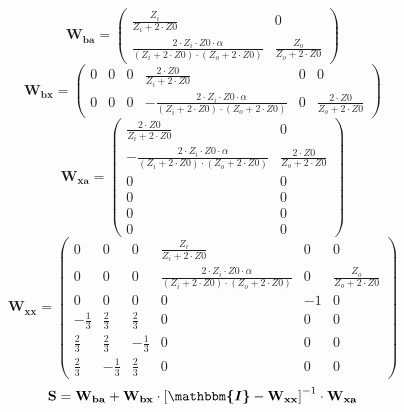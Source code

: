 \[ \mathbf{W_{ba}} = \left(\begin{smallmatrix} \frac{Z_i}{Z_i+2\cdot
Z0} & 0 \\ \frac{2\cdot Z_i\cdot Z0\cdot \alpha}{\left(Z_i+2\cdot
Z0\right)\cdot\left(Z_o+2\cdot Z0\right)} & \frac{Z_o}{Z_o+2\cdot Z0}
\end{smallmatrix}\right) \]
\[ \mathbf{W_{bx}} = \left(\begin{smallmatrix} 0 & 0 & 0 &
\frac{2\cdot Z0}{Z_i+2\cdot Z0} & 0 & 0 \\ 0 & 0 & 0 & -\frac{2\cdot
Z_i\cdot Z0\cdot \alpha}{\left(Z_i+2\cdot
Z0\right)\cdot\left(Z_o+2\cdot Z0\right)} & 0 & \frac{2\cdot
Z0}{Z_o+2\cdot Z0} \end{smallmatrix}\right) \]
\[ \mathbf{W_{xa}} = \left(\begin{smallmatrix} \frac{2\cdot
Z0}{Z_i+2\cdot Z0} & 0 \\ -\frac{2\cdot Z_i\cdot Z0\cdot
\alpha}{\left(Z_i+2\cdot Z0\right)\cdot\left(Z_o+2\cdot Z0\right)} &
\frac{2\cdot Z0}{Z_o+2\cdot Z0} \\ 0 & 0 \\ 0 & 0 \\ 0 & 0 \\ 0 & 0
\end{smallmatrix}\right) \]
\[ \mathbf{W_{xx}} = \left(\begin{smallmatrix} 0 & 0 & 0 &
\frac{Z_i}{Z_i+2\cdot Z0} & 0 & 0 \\ 0 & 0 & 0 & \frac{2\cdot Z_i\cdot
Z0\cdot \alpha}{\left(Z_i+2\cdot Z0\right)\cdot\left(Z_o+2\cdot
Z0\right)} & 0 & \frac{Z_o}{Z_o+2\cdot Z0} \\ 0 & 0 & 0 & 0 & -1 & 0
\\ -\frac{1}{3} & \frac{2}{3} & \frac{2}{3} & 0 & 0 & 0 \\ \frac{2}{3}
& \frac{2}{3} & -\frac{1}{3} & 0 & 0 & 0 \\ \frac{2}{3} & -\frac{1}{3}
& \frac{2}{3} & 0 & 0 & 0 \end{smallmatrix}\right) \]
\[ \mathbf{S}=\mathbf{W_{ba}}+\mathbf{W_{bx}}\cdot\left[
\boldsymbol{\mathbbm{I}}
-\mathbf{W_{xx}}\right]^{-1}\cdot\mathbf{W_{xa}} \]
